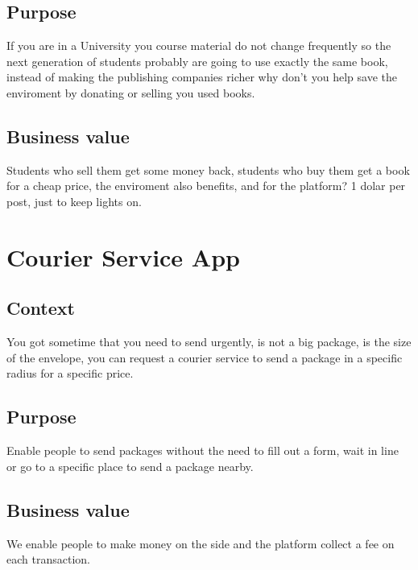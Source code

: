 \documentclass[12pt]{article}
\begin{document}
\subsection{Purpose}
If you are in a University you course material do not change frequently so
the next generation of students probably are going to use exactly the same 
book, instead of making the publishing companies richer why don't you help 
save the enviroment by donating or selling you used books.

\subsection{Business value}
Students who sell them get some money back, students who buy them get a book 
for a cheap price, the enviroment also benefits, and for the platform? 1 dolar
per post, just to keep lights on.

\pagebreak

\section{Courier Service App}
\subsection{Context}
You got sometime that you need to send urgently, is not a big package, is the 
size of the envelope, you can request a courier service to send a package 
in a specific radius for a specific price.

\subsection{Purpose}
Enable people to send packages without the need to fill out a form, wait in 
line or go to a specific place to send a package nearby.

\subsection{Business value}
We enable people to make money on the side and the platform collect a fee
on each transaction.
\end{document}
